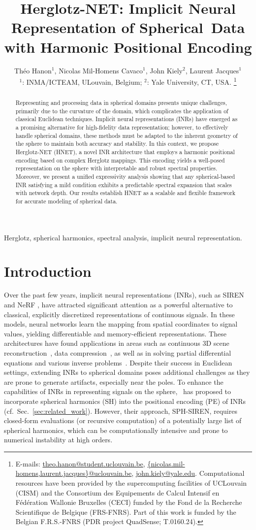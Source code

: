 \documentclass[conference]{IEEEtran}
\title{Herglotz-NET: Implicit Neural Representation of Spherical~Data with Harmonic Positional Encoding}
\author{Th\'eo Hanon$^1$, Nicolas Mil-Homens Cavaco$^1$, John Kiely$^2$, Laurent Jacques$^1$ \\[2mm]
\small $^1$: INMA/ICTEAM, ULouvain, Belgium; $^2$: Yale University, CT, USA.
\thanks{E-mails: \protect\url{theo.hanon@student.uclouvain.be}, \protect\url{{nicolas.mil-homens,laurent.jacques}@uclouvain.be}, \protect\url{john.kiely@yale.edu}. Computational resources have been provided by the supercomputing facilities of UCLouvain (CISM) and the Consortium des Equipements de Calcul Intensif en Fédération Wallonie Bruxelles (CECI) funded by the Fond de la Recherche Scientifique de Belgique (FRS-FNRS). Part of this work is funded by the Belgian F.R.S.-FNRS (PDR project QuadSense; T.0160.24).}
}
\begin{document}
\maketitle

\begin{abstract}
    Representing and processing data in spherical domains presents unique challenges, primarily due to the curvature of the domain, which complicates the application of classical Euclidean techniques. Implicit neural representations (INRs) have emerged as a promising alternative for high-fidelity data representation; however, to effectively handle spherical domains, these methods must be adapted to the inherent geometry of the sphere to maintain both accuracy and stability. In this context, we propose Herglotz-NET (HNET), a novel INR architecture that employs a harmonic positional encoding based on complex Herglotz mappings. This encoding yields a well-posed representation on the sphere with interpretable and robust spectral properties. Moreover, we present a unified expressivity analysis showing that any spherical-based INR satisfying a mild condition exhibits a predictable spectral expansion that scales with network depth. Our results establish HNET as a scalable and flexible framework for accurate modeling of spherical data.
\end{abstract}

\begin{IEEEkeywords}
Herglotz, spherical harmonics, spectral analysis, implicit neural representation.
\end{IEEEkeywords}

\section{Introduction}
Over the past few years, implicit neural representations (INRs), such as SIREN~\cite{sitzmann2020implicitneuralrepresentationsperiodic} and NeRF \cite{mildenhall2020nerfrepresentingscenesneural}, have attracted significant attention as a powerful alternative to classical, explicitly discretized representations of continuous signals. 
In these models, neural networks learn the mapping from spatial coordinates to signal values, yielding differentiable and memory-efficient representations. 
These architectures have found applications in areas such as continuous 3D scene reconstruction~\cite{mildenhall2020nerfrepresentingscenesneural}, data compression~\cite{dupont2021coin}, as well as in solving partial differential equations and various inverse problems~\cite{sitzmann2020implicitneuralrepresentationsperiodic,liu2022recovery}. 
Despite their success in Euclidean settings, extending INRs to spherical domains poses additional challenges as they are prone to generate artifacts, especially near the poles.  
To enhance the capabilities of INRs in representing signals on the sphere, \cite{russwurm2024locationencoding}~has proposed to incorporate spherical harmonics (SH) into the positional encoding (PE) of INRs (cf.~Sec.~\ref{sec:related_work}). 
However, their approach, SPH-SIREN, requires closed-form evaluations (or recursive computation) of a potentially large list of spherical harmonics, which can be computationally intensive and prone to numerical instability at high orders.
\end{document}

